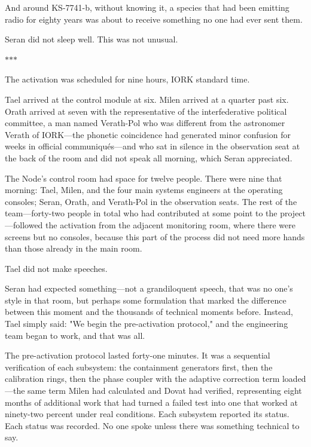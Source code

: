 \documentclass[11pt,a5paper,twoside]{book}
\begin{document}
And around KS-7741-b, without knowing it, a species that had been emitting radio for eighty years was about to receive something no one had ever sent them.

Seran did not sleep well. This was not unusual.

\vspace{1.5em}
\begin{center}$\ast$\quad$\ast$\quad$\ast$\end{center}
\vspace{1.5em}

The activation was scheduled for nine hours, IORK standard time.

Tael arrived at the control module at six. Milen arrived at a quarter past six. Orath arrived at seven with the representative of the interfederative political committee, a man named Verath-Pol who was different from the astronomer Verath of IORK—the phonetic coincidence had generated minor confusion for weeks in official communiqués—and who sat in silence in the observation seat at the back of the room and did not speak all morning, which Seran appreciated.

The Node's control room had space for twelve people. There were nine that morning: Tael, Milen, and the four main systems engineers at the operating consoles; Seran, Orath, and Verath-Pol in the observation seats. The rest of the team—forty-two people in total who had contributed at some point to the project—followed the activation from the adjacent monitoring room, where there were screens but no consoles, because this part of the process did not need more hands than those already in the main room.

Tael did not make speeches.

Seran had expected something—not a grandiloquent speech, that was no one's style in that room, but perhaps some formulation that marked the difference between this moment and the thousands of technical moments before. Instead, Tael simply said: "We begin the pre-activation protocol," and the engineering team began to work, and that was all.

The pre-activation protocol lasted forty-one minutes. It was a sequential verification of each subsystem: the containment generators first, then the calibration rings, then the phase coupler with the adaptive correction term loaded—the same term Milen had calculated and Dovat had verified, representing eight months of additional work that had turned a failed test into one that worked at ninety-two percent under real conditions. Each subsystem reported its status. Each status was recorded. No one spoke unless there was something technical to say.
\end{document}
